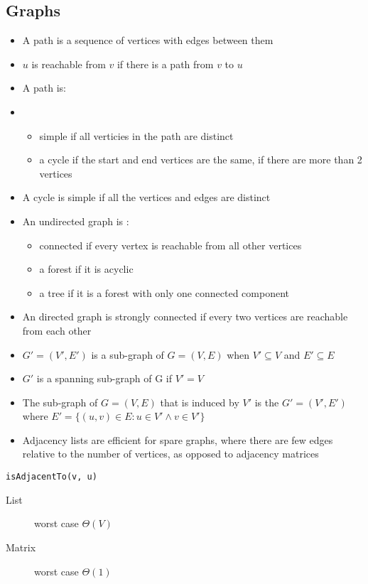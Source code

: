 \documentclass[landscape]{cheat}
\begin{document}
\begin{multicols*}{3}
\section{Graphs}

\begin{itemize}
    \item A path is a sequence of vertices with edges between them
    \item $u$ is reachable from $v$ if there is a path from $v$ to $u$
    \item A path is:
    \item \begin{itemize}
        \item simple if all verticies in the path are distinct
        \item a cycle if the start and end vertices are the same, if there are more than 2 vertices
    \end{itemize}
    \item A cycle is simple if all the vertices and edges are distinct
    \item An undirected graph is :
        \begin{itemize}
            \item connected if every vertex is reachable from all other vertices
            \item a forest if it is acyclic
            \item a tree if it is a forest with only one connected component
        \end{itemize}
    \item An directed graph is strongly connected if every two vertices are reachable from each other
    \item $G' = (V', E')$ is a sub-graph of $G = (V, E)$ when $V' \subseteq V$ and $E' \subseteq E$
    \item $G'$ is a spanning sub-graph of G if $V' = V$
    \item The sub-graph of $G = (V, E)$ that is induced by $V'$ is the $G' = (V', E')$ where $E' = \{(u, v) \in E: u \in V' \wedge v \in V' \}$
    \item Adjacency lists are efficient for spare graphs, where there are few edges relative to the number of vertices, as opposed to adjacency matrices
\end{itemize}

\begin{lstlisting}
isAdjacentTo(v, u)
\end{lstlisting}
\begin{description}
    \item[List] worst case $\Theta(V)$
    \item[Matrix] worst case $\Theta(1)$
\end{description}


\end{multicols*}
\end{document}
